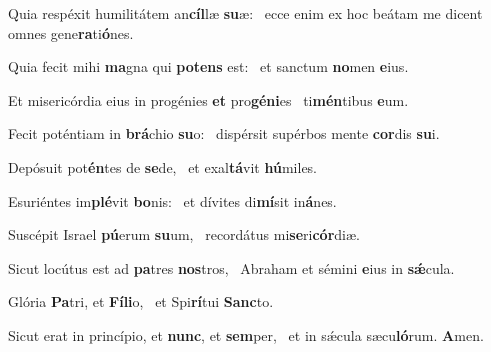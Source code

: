 \item Quia respéxit humilitátem an\textbf{cíl}læ \textbf{su}æ:~\psstar{} ecce enim ex hoc beátam me dicent omnes gene\textbf{ra}ti\textbf{ó}nes.

\item Quia fecit mihi \textbf{ma}gna qui \textbf{pot}\textbf{ens} est:~\psstar{} et sanctum \textbf{no}men \textbf{e}ius.

\item Et misericórdia eius in progénies \textbf{et} pro\textbf{gé}\textbf{ni}es~\psstar{} ti\textbf{mén}tibus \textbf{e}um.

\item Fecit poténtiam in \textbf{brá}chio \textbf{su}o:~\psstar{} dispérsit supérbos mente \textbf{cor}dis \textbf{su}i.

\item Depósuit pot\textbf{én}tes de \textbf{se}de,~\psstar{} et exal\textbf{tá}vit \textbf{hú}miles.

\item Esuriéntes im\textbf{plé}vit \textbf{bo}nis:~\psstar{} et dívites di\textbf{mí}sit in\textbf{á}nes.

\item Suscépit Israel \textbf{pú}erum \textbf{su}um,~\psstar{} recordátus mi\textbf{se}ri\textbf{cór}diæ.

\item Sicut locútus est ad \textbf{pa}tres \textbf{nos}tros,~\psstar{} Abraham et sémini \textbf{e}ius in \textbf{sǽ}cula.

\item Glória \textbf{Pa}tri, et \textbf{Fí}\textbf{li}o,~\psstar{} et Spi\textbf{rí}tui \textbf{Sanc}to.

\item Sicut erat in princípio, et \textbf{nunc}, et \textbf{sem}per,~\psstar{} et in sǽcula sæcu\textbf{ló}rum. \textbf{A}men.